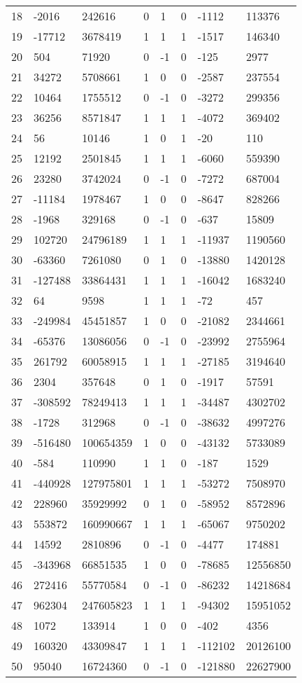 \documentclass{amsart}
\begin{document}
\begin{longtable}{|l|l|l|lllll|}
18&-2016&242616&0&1&0&-1112&113376\\
19&-17712&3678419&1&1&1&-1517&146340\\
20&504&71920&0&-1&0&-125&2977\\
21&34272&5708661&1&0&0&-2587&237554\\
22&10464&1755512&0&-1&0&-3272&299356\\
23&36256&8571847&1&1&1&-4072&369402\\
24&56&10146&1&0&1&-20&110\\
25&12192&2501845&1&1&1&-6060&559390\\
26&23280&3742024&0&-1&0&-7272&687004\\
27&-11184&1978467&1&0&0&-8647&828266\\
28&-1968&329168&0&-1&0&-637&15809\\
29&102720&24796189&1&1&1&-11937&1190560\\
30&-63360&7261080&0&1&0&-13880&1420128\\
31&-127488&33864431&1&1&1&-16042&1683240\\
32&64&9598&1&1&1&-72&457\\
33&-249984&45451857&1&0&0&-21082&2344661\\
34&-65376&13086056&0&-1&0&-23992&2755964\\
35&261792&60058915&1&1&1&-27185&3194640\\
36&2304&357648&0&1&0&-1917&57591\\
37&-308592&78249413&1&1&1&-34487&4302702\\
38&-1728&312968&0&-1&0&-38632&4997276\\
39&-516480&100654359&1&0&0&-43132&5733089\\
40&-584&110990&1&1&0&-187&1529\\
41&-440928&127975801&1&1&1&-53272&7508970\\
42&228960&35929992&0&1&0&-58952&8572896\\
43&553872&160990667&1&1&1&-65067&9750202\\
44&14592&2810896&0&-1&0&-4477&174881\\
45&-343968&66851535&1&0&0&-78685&12556850\\
46&272416&55770584&0&-1&0&-86232&14218684\\
47&962304&247605823&1&1&1&-94302&15951052\\
48&1072&133914&1&0&0&-402&4356\\
49&160320&43309847&1&1&1&-112102&20126100\\
50&95040&16724360&0&-1&0&-121880&22627900\\
\hline
\end{longtable}
\end{document}
